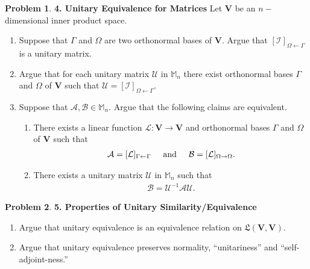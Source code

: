 \documentclass{book}
\theoremstyle{definition}
\newtheorem*{prob*}{Problem}
\newcommand{\V}{\mathbf{V}}
\newcommand{\A}{\mathcal{A}}
\newcommand{\B}{\mathcal{B}}
\newcommand{\lag}{\mathcal{L}}
\newcommand{\LL}{\mathfrak{L}}
\begin{document}
\begin{prob*}\textbf{4. Unitary Equivalence for Matrices}
	Let $\V$ be an $n-$dimensional inner product space. 
	\begin{enumerate}
		\item Suppose that $\Gamma$ and $\Omega$ are two orthonormal bases of $\V$. Argue that $[\mathcal{I}]_{\Omega\leftarrow\Gamma}$ is a unitary matrix. 
		
		\item Argue that for each unitary matrix $\mathcal{U}$ in $\mathbb{M}_n$ there exist orthonormal bases $\Gamma$ and $\Omega$ of $\V$ such that $\mathcal{U} = [\mathcal{I}]_{\Omega\leftarrow\Gamma}$. 
		
		
		\item Suppose that $\A,\B \in \mathbb{M}_n$. Argue that the following claims are equivalent. 
		\begin{enumerate}
			\item There exists a linear function $\lag: \V \to \V$ and orthonormal bases $\Gamma$ and $\Omega$ of $\V$ such that 
			\begin{align*}
			\A = [\lag]_{\Gamma\leftarrow\Gamma} \hspace{0.5cm} \text{and} \hspace{0.5cm} \B = [\lag]_{\Omega\to \Omega}.
			\end{align*}
			
			\item There exists a unitary matrix $\mathcal{U}$ in $\mathbb{M}_n$ such that 
			\begin{align*}
			\B = \mathcal{U}^{-1}\A \mathcal{U}. 
			\end{align*}
		\end{enumerate}
	\end{enumerate}
\end{prob*}





\newpage






\begin{prob*}\textbf{5. Properties of Unitary Similarity/Equivalence}
	\begin{enumerate}
		\item Argue that unitary equivalence is an equivalence relation on $\LL(\V,\V)$. 
		\item Argue that unitary equivalence preserves normality, ``unitariness'' and ``self-adjoint-ness.''
	\end{enumerate}
	
\end{prob*}
\end{document}
